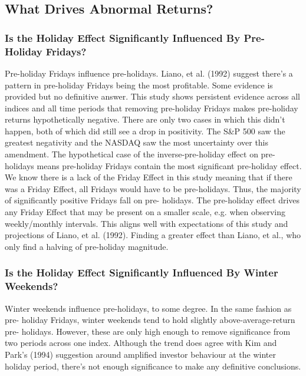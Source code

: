 \documentclass[11pt, english]{article}
\begin{document}
	\newpage

	\subsection{What Drives Abnormal Returns?}

		\subsubsection{Is the Holiday Effect Significantly Influenced By Pre-Holiday Fridays?}

		Pre-holiday Fridays influence pre-holidays. Liano, et al. (1992) suggest there’s a pattern in pre-holiday Fridays being the most profitable. Some evidence is provided but no definitive answer. This study shows persistent evidence across all indices and all time periods that removing pre-holiday Fridays makes pre-holiday returns hypothetically negative. There are only two cases in which this didn’t happen, both of which did still see a drop in positivity. The S\&P 500 saw the greatest negativity and the NASDAQ saw the most uncertainty over this amendment. The hypothetical case of the inverse-pre-holiday effect on pre-holidays means pre-holiday Fridays contain the most significant pre-holiday effect. We know there is a lack of the Friday Effect in this study meaning that if there was a Friday Effect, all Fridays would have to be pre-holidays. Thus, the majority of significantly positive Fridays fall on pre- holidays. The pre-holiday effect drives any Friday Effect that may be present on a smaller scale, e.g. when observing weekly/monthly intervals. This aligns well with expectations of this study and projections of Liano, et al. (1992). Finding a greater effect than Liano, et al., who only find a halving of pre-holiday magnitude.

		\subsubsection{Is the Holiday Effect Significantly Influenced By Winter Weekends?}

		Winter weekends influence pre-holidays, to some degree. In the same fashion as pre- holiday Fridays, winter weekends tend to hold slightly above-average-return pre- holidays. However, these are only high enough to remove significance from two periods across one index. Although the trend does agree with Kim and Park’s (1994) suggestion around amplified investor behaviour at the winter holiday period, there’s not enough significance to make any definitive conclusions.
\end{document}
